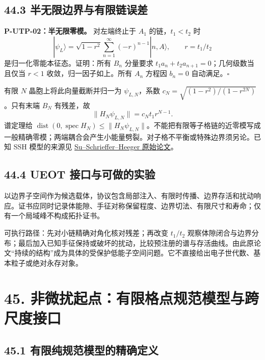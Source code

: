 \documentclass[
  11pt,
  oneside]{book}
\begin{document}
\hypertarget{ux534aux65e0ux9650ux8fb9ux754cux4e0eux6709ux9650ux94feux8befux5dee}{%
\section{44.3
半无限边界与有限链误差}\label{ux534aux65e0ux9650ux8fb9ux754cux4e0eux6709ux9650ux94feux8befux5dee}}

\protect\hypertarget{p-utp-02}{}{}

\textbf{P-UTP-02：半无限零模。} 对左端终止于 \(A_1\) 的链，\(t_1<t_2\)
时 \[
|\psi_L\rangle=\sqrt{1-r^2}\sum_{n=1}^\infty(-r)^{n-1}|n,A\rangle,
\qquad r=t_1/t_2
\] 是归一化零能本征态。证明：所有 \(B_n\) 分量要求
\(t_1a_n+t_2a_{n+1}=0\)；几何级数当且仅当 \(r<1\)
收敛，归一因子如上。所有 \(A_n\) 方程因 \(b_n=0\) 自动满足。\(\square\)

有限 \(N\) 晶胞上将此向量截断并归一为 \(\psi_{L,N}\)，系数
\(c_N=\sqrt{(1-r^2)/(1-r^{2N})}\)。只有末端 \(B_N\) 有残差，故 \[
\|H_N\psi_{L,N}\|=c_Nt_1r^{N-1}.
\] 谱定理给
\(\operatorname{dist}(0,\operatorname{spec}H_N)\le\|H_N\psi_{L,N}\|\)。不能把有限等子格链的近零模写成一般精确零模；两端耦合会产生小能量劈裂。对子格不平衡或特殊边界须另论。已知
SSH 模型的来源见
\href{https://link.aps.org/doi/10.1103/PhysRevLett.42.1698}{Su--Schrieffer--Heeger
原始论文}。

\hypertarget{ueot-ux63a5ux53e3ux4e0eux53efux505aux7684ux5b9eux9a8c}{%
\section{44.4 UEOT
接口与可做的实验}\label{ueot-ux63a5ux53e3ux4e0eux53efux505aux7684ux5b9eux9a8c}}

以边界子空间作为候选载体，协议包含局部注入、有限时传播、边界存活和扰动响应。证书应同时记录体能隙、手征对称保留程度、边界切法、有限尺寸和寿命；仅有一个局域峰不构成拓扑证书。

可执行路径：先对小链精确对角化核对残差；再改变 \(t_1/t_2\)
观察体隙闭合与边界分布；最后加入已知手征保持或破坏的扰动，比较预注册的谱与存活曲线。由此原论文``持续的结构''成为具体的受保护低能子空间问题。它不直接给出电子世代数、基本粒子或绝对永存对象。

\hypertarget{ch-45}{%
\chapter{45. 非微扰起点：有限格点规范模型与跨尺度接口}\label{ch-45}}

\hypertarget{ux6709ux9650ux7eafux89c4ux8303ux6a21ux578bux7684ux7cbeux786eux5b9aux4e49}{%
\section{45.1
有限纯规范模型的精确定义}\label{ux6709ux9650ux7eafux89c4ux8303ux6a21ux578bux7684ux7cbeux786eux5b9aux4e49}}
\end{document}
